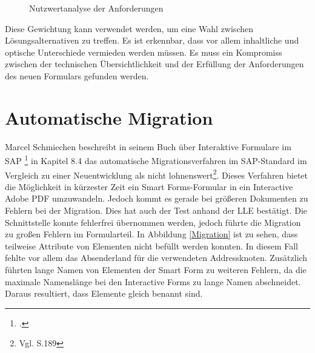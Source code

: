 \begin{figure}[ht]
	\centering
	\caption{Nutzwertanalyse der Anforderungen}
	\label{figNutz}
\end{figure}

Diese Gewichtung kann verwendet werden, um eine Wahl zwischen Lösungsalternativen zu treffen. Es ist erkennbar, dass vor allem inhaltliche und optische Unterschiede vermieden werden müssen. Es muss ein Kompromiss zwischen der technischen Übersichtlichkeit und der Erfüllung der Anforderungen des neuen Formulars gefunden werden.


\section{Automatische Migration}
\label{ch:Migration}

Marcel Schmiechen beschreibt in seinem Buch über Interaktive Formulare im SAP \footcite{Schmiechen.2016} in Kapitel 8.4 das automatische Migrationsverfahren im SAP-Standard im Vergleich zu einer Neuentwicklung als nicht lohnenswert\footnote{Vgl. \cite{Schmiechen.2016} S.189}. Dieses Verfahren bietet die Möglichkeit in kürzester Zeit ein Smart Forms-Formular in ein Interactive Adobe \ac{PDF} umzuwandeln. Jedoch kommt es gerade bei größeren Dokumenten zu Fehlern bei der Migration. Dies hat auch der Test anhand der \ac{LLE} bestätigt. Die Schnittstelle konnte fehlerfrei übernommen werden, jedoch führte die Migration zu großen Fehlern im Formularteil. In Abbildung \ref{Migration} ist zu sehen, dass teilweise Attribute von Elementen nicht befüllt werden konnten. In diesem Fall fehlte vor allem das Absenderland für die verwendeten Addressknoten. Zusätzlich führten lange Namen von Elementen der Smart Form zu weiteren Fehlern, da die maximale Namenslänge bei den Interactive Forms zu lange Namen abschneidet. Daraus resultiert, dass Elemente gleich benannt sind.

